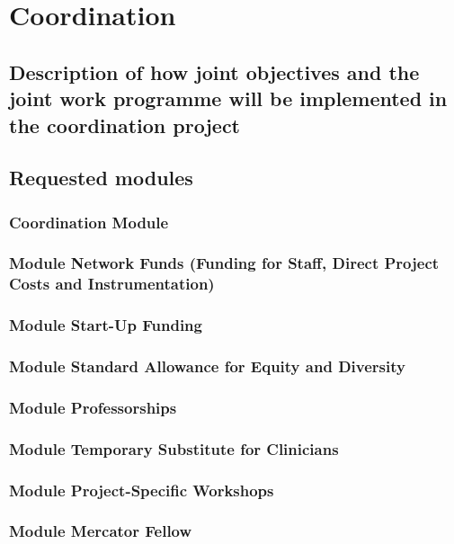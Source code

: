 \documentclass[english, 53.02]{proposal}
\begin{document}
\clearpage
\section{Coordination}

\subsection{Description of how joint objectives and the joint work programme will be implemented in the coordination project}

\subsection{Requested modules}

\subsubsection{Coordination Module}

\subsubsection{Module Network Funds (Funding for Staff, Direct Project Costs and Instrumentation)}

\subsubsection{Module Start-Up Funding}

\subsubsection{Module Standard Allowance for Equity and Diversity}

\subsubsection{Module Professorships}

\subsubsection{Module Temporary Substitute for Clinicians}

\subsubsection{Module Project-Specific Workshops}

\subsubsection{Module Mercator Fellow}
\end{document}

